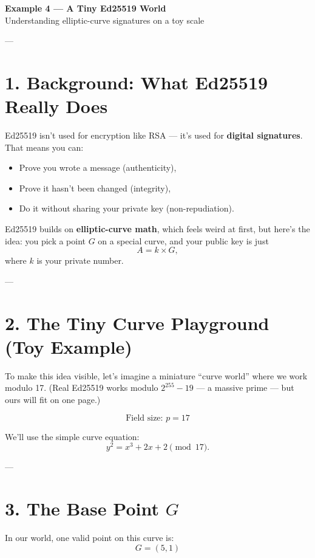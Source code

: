 \documentclass[12pt]{article}
\begin{document}
\begin{center}
    {\LARGE \textbf{Example 4 — A Tiny Ed25519 World}}\\[1em]
    {\large Understanding elliptic-curve signatures on a toy scale}
\end{center}

---

\section*{1. Background: What Ed25519 Really Does}

Ed25519 isn’t used for encryption like RSA — it’s used for \textbf{digital signatures}.  
That means you can:
\begin{itemize}
    \item Prove you wrote a message (authenticity),
    \item Prove it hasn’t been changed (integrity),
    \item Do it without sharing your private key (non-repudiation).
\end{itemize}

\vspace{0.5em}
Ed25519 builds on \textbf{elliptic-curve math}, which feels weird at first, but here’s the idea:
you pick a point \( G \) on a special curve, and your public key is just
\[
A = k \times G,
\]
where \( k \) is your private number.

---

\section*{2. The Tiny Curve Playground (Toy Example)}

To make this idea visible, let’s imagine a miniature “curve world” where we work modulo 17.  
(Real Ed25519 works modulo \( 2^{255} - 19 \) — a massive prime — but ours will fit on one page.)

\[
\text{Field size: } p = 17
\]

We’ll use the simple curve equation:
\[
y^2 = x^3 + 2x + 2 \pmod{17}.
\]

---

\section*{3. The Base Point \( G \)}

In our world, one valid point on this curve is:
\[
G = (5, 1)
\]
\end{document}
